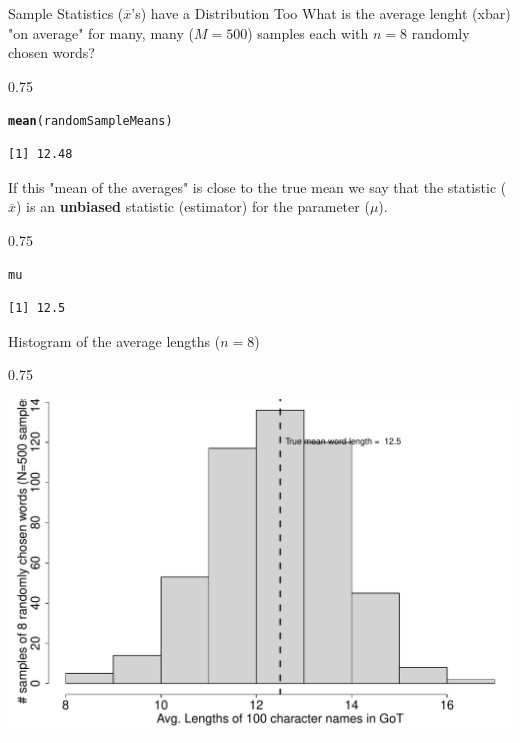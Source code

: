 \documentclass{beamer}\usepackage[]{graphicx}\usepackage[]{color}
\makeatletter
\newcommand{\hlstd}[1]{\textcolor[rgb]{0.102,0.102,0.102}{#1}}%
\newcommand{\hlkwd}[1]{\textcolor[rgb]{0.102,0.102,0.102}{\textbf{#1}}}%
\newenvironment{kframe}{%
 \def\at@end@of@kframe{}%
 \ifinner\ifhmode%
  \def\at@end@of@kframe{\end{minipage}}%
  \begin{minipage}{\columnwidth}%
 \fi\fi%
 \def\FrameCommand##1{\hskip\@totalleftmargin \hskip-\fboxsep
 \colorbox{shadecolor}{##1}\hskip-\fboxsep
     \hskip-\linewidth \hskip-\@totalleftmargin \hskip\columnwidth}%
 \MakeFramed {\advance\hsize-\width
   \@totalleftmargin\z@ \linewidth\hsize
   \@setminipage}}%
 {\par\unskip\endMakeFramed%
 \at@end@of@kframe}
\newenvironment{knitrout}{}{} %
\renewenvironment{knitrout}{\begin{spacing}{0.75}\begin{tiny}}{\end{tiny}\end{spacing}}
\newcommand{\xbar}{\overline{x}}
\makeatother
\begin{document}
\begin{frame}{Sample Statistics ($\xbar$'s) have a Distribution Too\;\;}
What is the average lenght (xbar) "on average" for many, many ($M=500$)
samples each with $n=8$ randomly chosen words?  
\begin{knitrout}\small
{}\color{fgcolor}\begin{kframe}
\begin{alltt}
\hlkwd{mean}\hlstd{(randomSampleMeans)}
\end{alltt}
\begin{verbatim}
[1] 12.48
\end{verbatim}
\end{kframe}
\end{knitrout}
If this "mean of the averages" is close to the true mean
we say that the statistic ($\xbar$) is an
\textbf{unbiased} statistic (estimator) for the parameter ($\mu$).
\begin{knitrout}\small
{}\color{fgcolor}\begin{kframe}
\begin{alltt}
\hlstd{mu}
\end{alltt}
\begin{verbatim}
[1] 12.5
\end{verbatim}
\end{kframe}
\end{knitrout}


Histogram of the average lengths ($n=8$)
\begin{knitrout}\small
{}\color{fgcolor}

{\centering \includegraphics[width=0.79\linewidth]{figure/graphics-unnamed-chunk-38-1} 

}



\end{knitrout}

\newpage


\end{frame}
\end{document}
